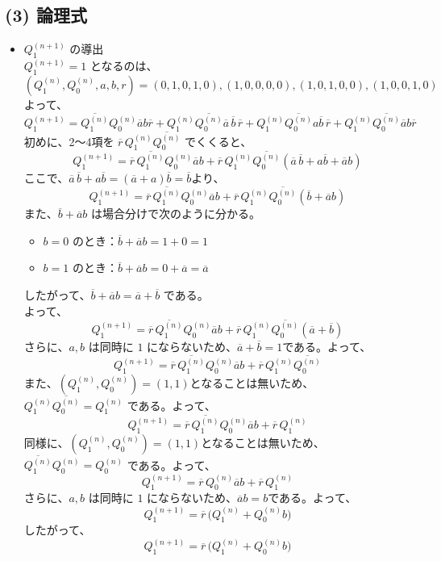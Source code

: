 \documentclass[11pt,a4paper]{jlreq}
\begin{document}
\vspace{0.6\baselineskip}

\subsection*{(3) 論理式}
\begin{itemize}
\item $Q_1^{(n+1)}$ の導出 \\
$Q_1^{(n+1)}=1$ となるのは、\\
\[
(Q_1^{(n)},Q_0^{(n)},a,b,r)=(0,1,0,1,0),(1,0,0,0,0),(1,0,1,0,0),(1,0,0,1,0)
\]
よって、
\[
Q_1^{(n+1)}=\overline{Q_1^{(n)}}Q_0^{(n)}\overline{a}b\overline{r}+Q_1^{(n)}\overline{Q_0^{(n)}}\overline{a}\,\overline{b}\,\overline{r}+Q_1^{(n)}\overline{Q_0^{(n)}}a\overline{b}\,\overline{r}+Q_1^{(n)}\overline{Q_0^{(n)}}\overline{a}b\overline{r}
\]
初めに、2〜4項を $\overline{r}\,Q_1^{(n)}\overline{Q_0^{(n)}}$ でくくると、\\
\[
Q_1^{(n+1)}=\overline{r}\,\overline{Q_1^{(n)}}Q_0^{(n)}\overline{a}b+\overline{r}\,Q_1^{(n)}\overline{Q_0^{(n)}}(\overline{a}\,\overline{b}+a\overline{b}+\overline{a}b)
\]
ここで、$\overline{a}\,\overline{b}+a\overline{b}=(\overline{a}+a)\overline{b}=\overline{b}$より、
\vspace{0.3\baselineskip}
\[
Q_1^{(n+1)}=\overline{r}\,\overline{Q_1^{(n)}}Q_0^{(n)}\overline{a}b+\overline{r}\,Q_1^{(n)}\overline{Q_0^{(n)}}(\overline{b}+\overline{a}b)
\]
また、$\overline{b}+\overline{a}b$ は場合分けで次のように分かる。
\begin{itemize}
\item $b=0$ のとき：$\overline{b}+\overline{a}b=1+0=1$
\item $b=1$ のとき：$\overline{b}+\overline{a}b=0+\overline{a}=\overline{a}$
\end{itemize}
したがって、$\overline{b}+\overline{a}b=\overline{a}+\overline{b}$ である。\\
よって、
\vspace{0.3\baselineskip}
\[
Q_1^{(n+1)}=\overline{r}\,\overline{Q_1^{(n)}}Q_0^{(n)}\overline{a}b+\overline{r}\,Q_1^{(n)}\overline{Q_0^{(n)}}(\overline{a}+\overline{b})
\]
さらに、$a,b$ は同時に $1$ にならないため、$\overline{a}+\overline{b}=1$である。よって、 \\
\[
Q_1^{(n+1)}=\overline{r}\,\overline{Q_1^{(n)}}Q_0^{(n)}\overline{a}b+\overline{r}\,Q_1^{(n)}\overline{Q_0^{(n)}}
\]
また、$(Q_1^{(n)},Q_0^{(n)}) = (1,1)$となることは無いため、$Q_1^{(n)}\overline{Q_0^{(n)}}=Q_1^{(n)}$ である。よって、\\
\[
Q_1^{(n+1)}=\overline{r}\,\overline{Q_1^{(n)}}Q_0^{(n)}\overline{a}b +\overline{r}\,Q_1^{(n)}
\]
同様に、$(Q_1^{(n)},Q_0^{(n)}) = (1,1)$となることは無いため、$\overline{Q_1^{(n)}}Q_0^{(n)}=Q_0^{(n)}$ である。よって、\\
\[
Q_1^{(n+1)}=\overline{r}\,Q_0^{(n)}\overline{a}b +\overline{r}\,Q_1^{(n)}
\]
さらに、$a,b$ は同時に $1$ にならないため、$\overline{a}b = b$である。よって、 \\
\[
Q_1^{(n+1)}=\overline{r}\,\bigl(Q_1^{(n)}+Q_0^{(n)}b\bigr)
\]
したがって、
\vspace{0.3\baselineskip}
\[
Q_1^{(n+1)}=\overline{r}\,\bigl(Q_1^{(n)}+Q_0^{(n)}b\bigr)
\]


\end{itemize}
\end{document}
